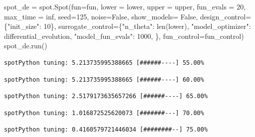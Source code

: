 \documentclass[
  letterpaper,
  DIV=11,
  numbers=noendperiod]{scrreprt}
\newenvironment{Shaded}{\begin{snugshade}}{\end{snugshade}}
\newcommand{\BuiltInTok}[1]{\textcolor[rgb]{0.00,0.23,0.31}{#1}}
\newcommand{\DecValTok}[1]{\textcolor[rgb]{0.68,0.00,0.00}{#1}}
\newcommand{\NormalTok}[1]{\textcolor[rgb]{0.00,0.23,0.31}{#1}}
\newcommand{\OperatorTok}[1]{\textcolor[rgb]{0.37,0.37,0.37}{#1}}
\newcommand{\StringTok}[1]{\textcolor[rgb]{0.13,0.47,0.30}{#1}}
\newcommand{\VariableTok}[1]{\textcolor[rgb]{0.07,0.07,0.07}{#1}}
\begin{document}
\begin{Shaded}
\begin{Highlighting}[]
\NormalTok{spot\_de }\OperatorTok{=}\NormalTok{ spot.Spot(fun}\OperatorTok{=}\NormalTok{fun,}
\NormalTok{                   lower }\OperatorTok{=}\NormalTok{ lower,}
\NormalTok{                   upper }\OperatorTok{=}\NormalTok{ upper,}
\NormalTok{                   fun\_evals }\OperatorTok{=} \DecValTok{20}\NormalTok{,}
\NormalTok{                   max\_time }\OperatorTok{=}\NormalTok{ inf,}
\NormalTok{                   seed}\OperatorTok{=}\DecValTok{125}\NormalTok{,}
\NormalTok{                   noise}\OperatorTok{=}\VariableTok{False}\NormalTok{,}
\NormalTok{                   show\_models}\OperatorTok{=} \VariableTok{False}\NormalTok{,}
\NormalTok{                   design\_control}\OperatorTok{=}\NormalTok{\{}\StringTok{"init\_size"}\NormalTok{: }\DecValTok{10}\NormalTok{\},}
\NormalTok{                   surrogate\_control}\OperatorTok{=}\NormalTok{\{}\StringTok{"n\_theta"}\NormalTok{: }\BuiltInTok{len}\NormalTok{(lower),}
                                      \StringTok{"model\_optimizer"}\NormalTok{: differential\_evolution,}
                                      \StringTok{"model\_fun\_evals"}\NormalTok{: }\DecValTok{1000}\NormalTok{,}
\NormalTok{                                      \},}
\NormalTok{                  fun\_control}\OperatorTok{=}\NormalTok{fun\_control)}
\NormalTok{spot\_de.run()}
\end{Highlighting}
\end{Shaded}

\begin{verbatim}
spotPython tuning: 5.213735995388665 [######----] 55.00% 
\end{verbatim}

\begin{verbatim}
spotPython tuning: 5.213735995388665 [######----] 60.00% 
\end{verbatim}

\begin{verbatim}
spotPython tuning: 2.5179173635657266 [######----] 65.00% 
\end{verbatim}

\begin{verbatim}
spotPython tuning: 1.016872525620073 [#######---] 70.00% 
\end{verbatim}

\begin{verbatim}
spotPython tuning: 0.4160579721446034 [########--] 75.00% 
\end{verbatim}
\end{document}
